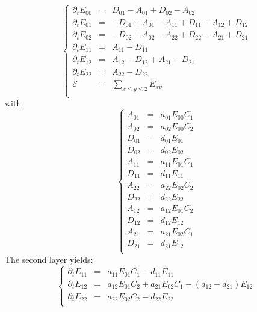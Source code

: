 \documentclass[aps,onecolumn,12pt]{revtex4}
\begin{document}
\begin{equation}
\left\lbrace
\begin{array}{rcl}
\partial_t E_{00} & = & D_{01}-A_{01} + D_{02}-A_{02}\\
\partial_t E_{01} & = & -D_{01}+A_{01} - A_{11} + D_{11} - A_{12} + D_{12}\\
\partial_t E_{02} & = & -D_{02}+A_{02} - A_{22} + D_{22} - A_{21} + D_{21}\\
\partial_t E_{11} & = & A_{11}-D_{11}\\
\partial_t E_{12} & = & A_{12}-D_{12} + A_{21}-D_{21}\\
\partial_t E_{22} & = & A_{22}-D_{22}\\
\mathcal{E}       & = & {\displaystyle \sum_{x\leq y\leq 2} E_{xy}}\\
\end{array}
\right.
\end{equation}
with
\begin{equation}
\left\lbrace
\begin{array}{rcl}
A_{01} &= &a_{01} E_{00} C_1\\
A_{02} &= &a_{02} E_{00} C_2\\
D_{01} &= &d_{01} E_{01}\\
D_{02} &= &d_{02} E_{02}\\
A_{11} &= & a_{11} E_{01} C_1 \\
D_{11} &= &d_{11} E_{11}\\
A_{22} &= &a_{22} E_{02} C_2 \\
D_{22} &= &d_{22} E_{22}\\
A_{12} & = & a_{12} E_{01} C_2\\
D_{12} & = & d_{12} E_{12}\\
A_{21} & = & a_{21} E_{02} C_1\\
D_{21} & = & d_{21} E_{12}\\
\end{array}
\right.
\end{equation}
The second layer yields:
\begin{equation}
\left\lbrace
\begin{array}{rcl}
\partial_t E_{11} & = & a_{11} E_{01} C_1 - d_{11} E_{11}\\
\partial_t E_{12} & = & a_{12} E_{01} C_2  + a_{21} E_{02} C_1 - \left(d_{12}+d_{21}\right) E_{12}\\
\partial_t E_{22} & = & a_{22} E_{02} C_2 -d_{22} E_{22}\\
\end{array}
\right.
\end{equation}
\end{document}
